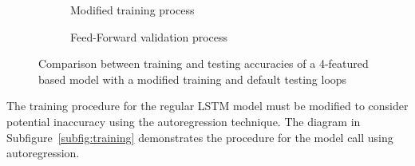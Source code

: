  {
    \begin{figure}[htbp]
        \centering
        \begin{subfigure}[b]{\columnwidth}
            \centering
            
            \caption{Modified training process}
        \end{subfigure}
        \begin{subfigure}[b]{\columnwidth}
            \centering
            
            \caption{Feed-Forward validation process}
        \end{subfigure}
        \caption{Comparison between training and testing accuracies of a 4-featured based model with a modified training and default testing loops}
        \label{fig:modefied_tr}
    \end{figure}
}
%
%
The training procedure for the regular LSTM model must be modified to consider potential inaccuracy using the autoregression technique.
The diagram in \mbox{Subfigure~\ref{subfig:training}} demonstrates the procedure for the model call using autoregression.
